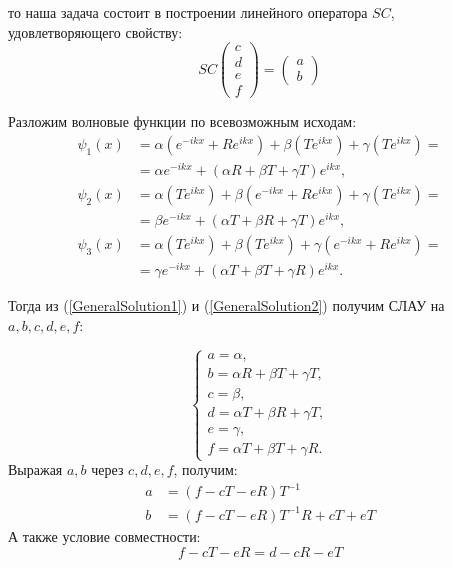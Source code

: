 \documentclass[a4 paper, 12 pt]{extarticle}
\begin{document}
   то наша задача состоит в построении линейного оператора $SC$, удовлетворяющего свойству:
   \[SC\left(
   \begin{array}{c}
   c \\
   d \\
   e \\
   f
   \end{array}\right) = \left(\begin{array}{c}
   a \\
   b
   \end{array}\right)\]
   
   Разложим волновые функции по всевозможным исходам:
   \begin{equation}
   \label{GeneralSolution2}
   \begin{aligned}
   \psi_1(x) &= \alpha\left(e^{-ikx} + Re^{ikx}\right) + \beta\left(Te^{ikx}\right) + \gamma \left(Te^{ikx}\right) = \\
   &= \alpha e^{-ikx} + \left(\alpha R + \beta T + \gamma T\right) e^{ikx}, \\
   \psi_2(x) &= \alpha \left(T e^{ikx}\right) + \beta \left(e^{-ikx} + R e^{ikx}\right) + \gamma \left(T e^{ikx}\right) = \\
   &= \beta e^{-ikx} + \left(\alpha T + \beta R + \gamma T\right) e^{ikx}, \\
   \psi_3(x) &= \alpha \left(T e^{ikx}\right) + \beta \left(T e^{ikx}\right) + \gamma \left(e^{-ikx} + R e^{ikx}\right) = \\
   &= \gamma e^{-ikx} + \left(\alpha T + \beta T + \gamma R\right) e^{ikx}.
   \end{aligned}
   \end{equation}
   
   Тогда из (\ref{GeneralSolution1}) и (\ref{GeneralSolution2}) получим СЛАУ на $a, b, c, d, e, f$:

   \[
   \begin{cases}
   a = \alpha, \\
   b = \alpha R + \beta T + \gamma T, \\
   c = \beta, \\
   d = \alpha T + \beta R + \gamma T, \\
   e = \gamma, \\
   f = \alpha T + \beta T + \gamma R.
   \end{cases}
   \]
   Выражая $a, b$ через $c, d, e, f$, получим:
   \[
   \begin{aligned}
   a &= \left(f - cT - eR\right)T^{-1} \\
   b &= \left(f - cT - eR\right)T^{-1}R + cT + eT
   \end{aligned}
   \]
   А также условие совместности:
   \begin{equation}
   \label{compabilityCondition}
   f - cT - eR = d - cR - eT
   \end{equation}
   
\end{document}
